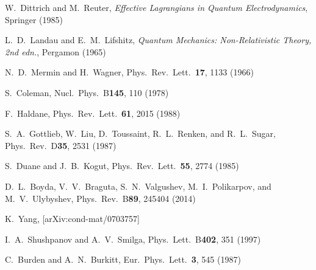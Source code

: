 \documentclass[aps,prd,twocolumn,showpacs,superscriptaddress,groupedaddress]{revtex4}  %
\begin{document}
\begin{thebibliography}{99}
W.~Dittrich and M.~Reuter, {\it Effective Lagrangians in Quantum Electrodynamics}, Springer (1985)

L.~D.~Landau and E.~M.~Lifshitz, {\it Quantum Mechanics: Non-Relativistic Theory, 2nd edn.}, Pergamon (1965)

N.~D.~Mermin and H.~Wagner, Phys.\ Rev.\ Lett.\ {\bf 17}, 1133 (1966)

S.~Coleman, Nucl.\ Phys.\ B{\bf 145}, 110 (1978)

F.~Haldane, Phys.\ Rev.\ Lett.\ {\bf  61}, 2015 (1988)

S.~A.~Gottlieb, W.~Liu, D.~Toussaint, R.~L.~Renken, and R.~L.~Sugar, Phys.\ Rev.\ D{\bf 35}, 2531 (1987)

S.~Duane and J.~B.~Kogut, Phys.\ Rev.\ Lett.\ {\bf 55}, 2774 (1985)

D.~L.~Boyda, V.~V.~Braguta, S.~N.~Valgushev, M.~I.~Polikarpov, and M.~V.~Ulybyshev, Phys.\ Rev.\ B{\bf 89}, 245404 (2014)

K.~Yang, [arXiv:cond-mat/0703757]

I.~A.~Shushpanov and A.~V.~Smilga, Phys.\ Lett.\ B{\bf 402}, 351 (1997)



C.~Burden and A.~N.~Burkitt, Eur.\ Phys.\ Lett.\ {\bf 3}, 545 (1987)


\end{thebibliography}
\end{document}
